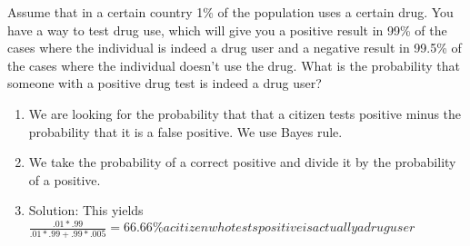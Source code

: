\documentclass[10pt]{article}
\newenvironment{problem}[2][Problem]{\begin{trivlist}
\item[\hskip \labelsep {\bfseries #1}\hskip \labelsep {\bfseries #2.}]}{\end{trivlist}}
\begin{document}
\begin{problem}{5.3}
Assume that in a certain country 1\% of the population uses a certain drug. You have a way to test drug use, which will give you a positive result in 99\% of the cases where the individual is indeed a drug user and a negative result in 99.5\% of the cases where the individual doesn't use the drug. What is the probability that someone with a positive drug test is indeed a drug user?
\begin{enumerate}
\item We are looking for the probability that that a citizen tests positive minus the probability that it is a false positive. We use Bayes rule.
\item We take the probability of a correct positive and divide it by the probability of a positive. 
\item Solution: This yields $\frac{.01*.99}{.01 * .99 + .99 * .005} = 66.66\% a citizen who tests positive is actually a drug user$
\end{enumerate}
\end{problem}
\end{document}
